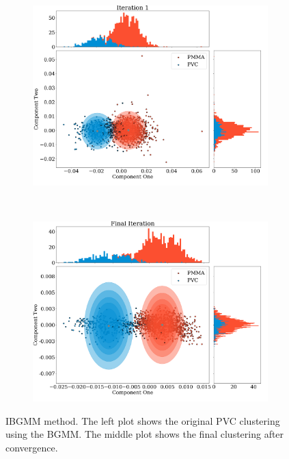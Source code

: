 \documentclass[a4paper,11pt]{article}
\begin{document}
\begin{figure}[htbp]
    \centering
    \begin{subfigure}[b]{0.48\textwidth}
        \includegraphics[width=\textwidth]{figures/PCAsphericalbefore.png}
    \end{subfigure}
    ~ %
    \begin{subfigure}[b]{0.48\textwidth}
        \includegraphics[width=\textwidth]{figures/PCAsphericalafter.png}
    \end{subfigure}
    \caption{IBGMM method. The left plot shows the original PVC clustering using the BGMM. The middle plot shows the final clustering after convergence.}
    \label{iterative_method}
\end{figure}
\end{document}
